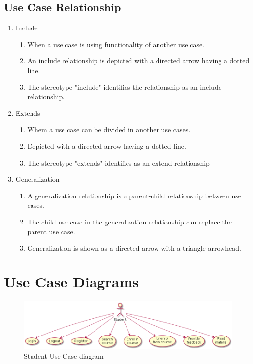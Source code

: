 \documentclass[12pt,a4paper,titlepage]{article}
\begin{document}
\subsection{Use Case Relationship}
\begin{enumerate}  

	\item Include
	\begin{enumerate}
		\item When a use case is using functionality of another use case.
		\item An include relationship is depicted with a directed arrow having a dotted line. 
		\item The stereotype "include" identifies the relationship as an include relationship.
	\end{enumerate}
	\item Extends
	\begin{enumerate}  
		\item Whem a use case can be divided in another use cases.
		\item Depicted with a directed arrow having a dotted line. 
		\item The stereotype "extends" identifies as an extend relationship
	\end{enumerate}
	\item Generalization
	\begin{enumerate}  
		\item A generalization relationship is a parent-child relationship between use cases.
		\item The child use case in the generalization relationship can replace the parent use case.
		\item Generalization is shown as a directed arrow with a triangle arrowhead.
	\end{enumerate}
\end{enumerate}

\section{Use Case Diagrams}

\begin{figure}[H]
\includegraphics[width=\textwidth]{student}
\caption{Student Use Case diagram}
\centering
\end{figure}
\end{document}
